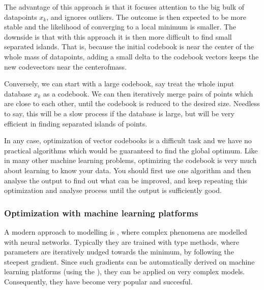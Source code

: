 \documentclass[letterpaper,10pt,english]{jupyterBook}
\begin{document}
\sphinxAtStartPar
The advantage of this approach is that it focuses attention to the big
bulk of datapoints \(x_{k}\), and ignores outliers. The outcome is
then expected to be more stable and the likelihood of converging to a
local minimum is smaller. The downside is that with this approach it is
then more difficult to find small separated islands. That is, because
the initial codebook is near the center of the whole mass of datapoints,
adding a small delta to the codebook vectors keeps the new codevectors
near the center\sphinxhyphen{}of\sphinxhyphen{}mass.

\sphinxAtStartPar
Conversely, we can start with a large codebook, say treat the whole
input database \(x_{k}\) as a codebook. We can then iteratively
merge pairs of points which are close to each other, until the codebook
is reduced to the desired size. Needless to say, this will be a slow
process if the database is large, but will be very efficient in finding
separated islands of points.

\sphinxAtStartPar
In any case, optimization of vector codebooks is a difficult task and we
have no practical algorithms which would be guaranteed to find the
global optimum. Like in many other machine learning problems, optimizing
the codebook is very much about learning to know your data. You should
first use one algorithm and then analyse the output to find out what can
be improved, and keep repeating this optimization and analyse process
until the output is sufficiently good.


\subsubsection{Optimization with machine learning platforms}
\label{\detokenize{Modelling/Vector_quantization_VQ:optimization-with-machine-learning-platforms}}
\sphinxAtStartPar
A modern approach to modelling is {\hyperref[\detokenize{Modelling/Neural_networks::doc}]{}}, where complex phenomena are modelled with neural networks. Typically they are trained with  type methods, where parameters are iteratively nudged towards the minimum, by following the steepest gradient. Since such gradients can be automatically derived on machine learning platforms (using the ), they can be applied on very complex models. Consequently, they have become very popular and succesful.
\end{document}
